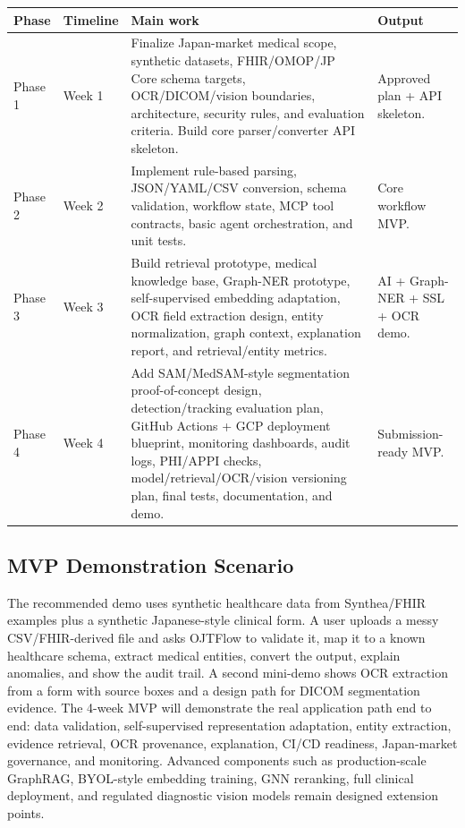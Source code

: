 \documentclass[11pt,a4paper]{article}
\begin{document}
\begin{longtable}{p{}p{}p{}p{}}
\toprule
\textbf{Phase} & \textbf{Timeline} & \textbf{Main work} & \textbf{Output} \\
\midrule
Phase 1 & Week 1 & Finalize Japan-market medical scope, synthetic datasets, FHIR/OMOP/JP Core schema targets, OCR/DICOM/vision boundaries, architecture, security rules, and evaluation criteria. Build core parser/converter API skeleton. & Approved plan + API skeleton. \\
\addlinespace
Phase 2 & Week 2 & Implement rule-based parsing, JSON/YAML/CSV conversion, schema validation, workflow state, MCP tool contracts, basic agent orchestration, and unit tests. & Core workflow MVP. \\
\addlinespace
Phase 3 & Week 3 & Build retrieval prototype, medical knowledge base, Graph-NER prototype, self-supervised embedding adaptation, OCR field extraction design, entity normalization, graph context, explanation report, and retrieval/entity metrics. & AI + Graph-NER + SSL + OCR demo. \\
\addlinespace
Phase 4 & Week 4 & Add SAM/MedSAM-style segmentation proof-of-concept design, detection/tracking evaluation plan, GitHub Actions + GCP deployment blueprint, monitoring dashboards, audit logs, PHI/APPI checks, model/retrieval/OCR/vision versioning plan, final tests, documentation, and demo. & Submission-ready MVP. \\
\bottomrule
\end{longtable}

\subsection{MVP Demonstration Scenario}

The recommended demo uses synthetic healthcare data from Synthea/FHIR examples plus a synthetic Japanese-style clinical form. A user uploads a messy CSV/FHIR-derived file and asks OJTFlow to validate it, map it to a known healthcare schema, extract medical entities, convert the output, explain anomalies, and show the audit trail. A second mini-demo shows OCR extraction from a form with source boxes and a design path for DICOM segmentation evidence. The 4-week MVP will demonstrate the real application path end to end: data validation, self-supervised representation adaptation, entity extraction, evidence retrieval, OCR provenance, explanation, CI/CD readiness, Japan-market governance, and monitoring. Advanced components such as production-scale GraphRAG, BYOL-style embedding training, GNN reranking, full clinical deployment, and regulated diagnostic vision models remain designed extension points.
\end{document}
